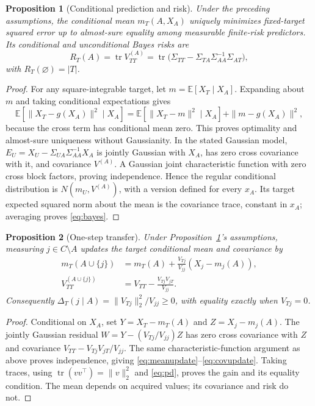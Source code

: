 \documentclass{article}
\newtheorem{proposition}{Proposition}
\newcommand{\tr}{\operatorname{tr}}
\newcommand{\E}{\mathbb{E}}
\begin{document}
\begin{proposition}[Conditional prediction and risk]\label{prop:prediction}
Under the preceding assumptions, the conditional mean $m_T(A,X_A)$ uniquely minimizes fixed-target squared error up to almost-sure equality among measurable finite-risk predictors. Its conditional and unconditional Bayes risks are
\begin{equation}
 R_T(A)=\tr V^{(A)}_{TT}
 =\tr\bigl(\Sigma_{TT}-\Sigma_{TA}\Sigma_{AA}^{-1}\Sigma_{AT}\bigr),
 \label{eq:bayes}
\end{equation}
with $R_T(\varnothing)=|T|$.
\end{proposition}
\begin{proof}
For any square-integrable target, let $m=\E[X_T\mid X_A]$. Expanding about $m$ and taking conditional expectations gives
\begin{equation}
 \E[\|X_T-g(X_A)\|^2\mid X_A]
 =\E[\|X_T-m\|^2\mid X_A]+\|m-g(X_A)\|^2,
 \label{eq:orthogonal}
\end{equation}
because the cross term has conditional mean zero. This proves optimality and almost-sure uniqueness without Gaussianity. In the stated Gaussian model, $E_U=X_U-\Sigma_{UA}\Sigma_{AA}^{-1}X_A$ is jointly Gaussian with $X_A$, has zero cross covariance with it, and covariance $V^{(A)}$. A Gaussian joint characteristic function with zero cross block factors, proving independence. Hence the regular conditional distribution is $N(m_U,V^{(A)})$, with a version defined for every $x_A$. Its target expected squared norm about the mean is the covariance trace, constant in $x_A$; averaging proves \eqref{eq:bayes}.
\end{proof}

\begin{proposition}[One-step transfer]\label{prop:gain}
Under Proposition~\ref{prop:prediction}'s assumptions, measuring $j\in C\setminus A$ updates the target conditional mean and covariance by
\begin{align}
 m_T(A\cup\{j\})&=m_T(A)+\frac{V_{Tj}}{V_{jj}}(X_j-m_j(A)),\label{eq:meanupdate}\\
 V^{(A\cup\{j\})}_{TT}&=V_{TT}-\frac{V_{Tj}V_{jT}}{V_{jj}}.\label{eq:covupdate}
\end{align}
Consequently $\Delta_T(j\mid A)=\|V_{Tj}\|_2^2/V_{jj}\geq0$, with equality exactly when $V_{Tj}=0$.
\end{proposition}
\begin{proof}
Conditional on $X_A$, set $Y=X_T-m_T(A)$ and $Z=X_j-m_j(A)$. The jointly Gaussian residual $W=Y-(V_{Tj}/V_{jj})Z$ has zero cross covariance with $Z$ and covariance $V_{TT}-V_{Tj}V_{jT}/V_{jj}$. The same characteristic-function argument as above proves independence, giving \eqref{eq:meanupdate}--\eqref{eq:covupdate}. Taking traces, using $\tr(vv^\top)=\|v\|_2^2$ and \eqref{eq:pd}, proves the gain and its equality condition. The mean depends on acquired values; its covariance and risk do not.
\end{proof}
\end{document}
